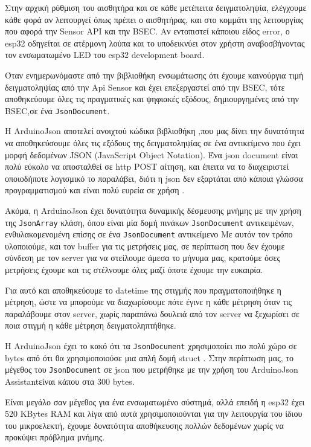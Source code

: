 Στην αρχική ρύθμιση του αισθητήρα και σε κάθε μετέπειτα δειγματοληψία, ελέγχουμε κάθε φορά αν λειτουργεί όπως πρέπει ο αισθητήρας, και στο κομμάτι της λειτουργίας
που αφορά την Sensor API και την BSEC.
Αν εντοπιστεί κάποιου είδος error, ο esp32 οδηγείται σε ατέρμονη λούπα και το υποδεικνύει στον χρήστη αναβοσβήνοντας τον ενσωματωμένο LED του esp32 development board.

Όταν ενημερωνόμαστε από την βιβλιοθήκη ενσωμάτωσης ότι έχουμε καινούργια τιμή δειγματοληψίας από την Api Sensor και έχει επεξεργαστεί από την BSEC,
τότε αποθηκεύουμε όλες τις πραγματικές και ψηφιακές εξόδους, δημιουργημένες από την BSEC,σε ένα \texttt{JsonDocument}.

Η ArduinoJson αποτελεί ανοιχτού κώδικα βιβλιοθήκη \cite{arduinojson},που μας δίνει την δυνατότητα να αποθηκεύσουμε 
όλες τις εξόδους της δειγματοληψίας σε ένα αντικείμενο που έχει μορφή δεδομένων JSON (JavaScript Object Notation).
Ένα json document είναι πολύ εύκολο να αποσταλθεί σε http POST αίτηση, και έπειτα
να το διαχειριστεί οποιοδήποτε λογισμικό το παραλάβει, διότι η json δεν εξαρτάται από κάποια γλώσσα προγραμματισμού
και είναι πολύ ευρεία σε χρήση \cite{json}.

Ακόμα, η ArduinoJson έχει δυνατότητα δυναμικής δέσμευσης μνήμης με την χρήση της \texttt{JsonArray} κλάση,
όπου είναι μία δομή πινάκων \texttt{JsonDocument} αντικειμένων, ενθυλακομενομένη επίσης σε ένα  \texttt{JsonDocument} αντικείμενο
Με αυτόν τον τρόπο υλοποιούμε, και τον buffer για τις μετρήσεις μας, σε περίπτωση που δεν έχουμε σύνδεση με τον server για να στείλουμε άμεσα το μήνυμα μας,
κρατούμε όσες μετρήσεις έχουμε και τις στέλνουμε όλες μαζί όποτε έχουμε την ευκαιρία.

Για αυτό και αποθηκεύουμε το datetime της στιγμής που πραγματοποιήθηκε η μέτρηση, ώστε να μπορούμε να διαχωρίσουμε πότε έγινε η κάθε μέτρηση όταν τις παραλάβουμε στον server,
χωρίς παραπάνω δουλειά από τον server να ξεχωρίσει σε ποια στιγμή η κάθε μέτρηση δειγματοληπτήθηκε.

Η ArduinoJson έχει το κακό ότι τα \texttt{JsonDocument} χρησιμοποίει πιο πολύ χώρο σε bytes από ότι θα χρησιμοποιούσε μια απλή δομή struct \cite{arduinoJSONram}.
Στην περίπτωση μας, το μέγεθος του \texttt{JsonDocument} σε json που μετρήθηκε με την χρήση του ArduinoJson Assistantείναι κάπου στα 300 bytes.

Είναι μεγάλο σαν μέγεθος για ένα ενσωματωμένο σύστημά, αλλά επειδή η esp32 έχει 520 KBytes RAM και λίγα από αυτά χρησιμοποιούνται για την λειτουργία του ίδιου του μικροελεκτή,
έχουμε δυνατότητα αποθήκευσης πολλών δεδομένων χωρίς να προκύψει πρόβλημα μνήμης.


